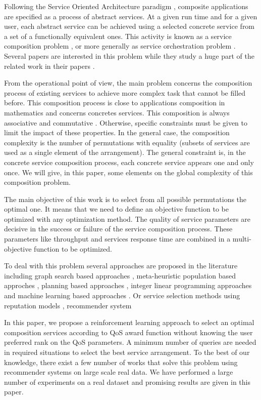 \documentclass[10pt,journal,compsoc]{IEEEtran}
\begin{document}
Following  the Service Oriented Architecture paradigm \cite{Alrifai:2010}, composite applications are specified as a process of abstract services. At a given run time and for a given user, each abstract service can be achieved using a selected concrete service from a set of a functionally equivalent ones. This activity is known as a service composition problem \cite{stelmach2013}, or more generally as service orchestration problem \cite{Papazoglou2007}. Several papers are interested in this problem while they study a huge part of the related work in their papers \cite{Essaid2017,Zheng2015}. 

From the operational point of view, the main problem concerns the composition process of existing services to achieve more complex task that cannot be filled before. This composition process is close to applications composition in mathematics and concerns concretes services. This composition is always associative and commutative \cite{GABREL2015}. Otherwise, specific constraints must be given to limit the impact of these properties. In the general case, the composition complexity is the number of permutations with equality (subsets of services are used as a single element of the arrangement). The general constraint is, in the concrete service composition process, each concrete service appears one and only once. We will give, in this paper, some elements on the global complexity of this composition problem. 

The main objective of this work is to select from all possible permutations the optimal one.  It means that we need to define an objective function to be optimized with any optimization method. The quality of service parameters are decisive in the success or failure of the service composition process. These parameters like throughput and services response time are combined in a multi-objective function to be optimized.  

To deal with this problem several approaches are proposed in the literature including graph search based approaches \cite{deng2014,jiang2014,Rodriguez2016,Siebert2015}, meta-heuristic population based approches \cite{Deng2017,Deng2016c,Chandra2016,Wu2016,Zheng2015}, planning based approaches \cite{chen2017,Zou2014}, integer linear programming approaches \cite{} and machine learning based approaches \cite{Deng2016s,Deng2016m,Rao2011,BenMabrouk2009}. Or service selection methods using reputation models \cite{Wang2007,Wang2011},  recommender system \cite{Manikrao2005,Liu2005}

In this paper, we propose a reinforcement learning approach to select an optimal composition services according to QoS award function without knowing the user preferred rank on the QoS parameters. A minimum number of queries are needed in required situations to select the best service arrangement. To the best of our knowledge, there exist a few number of works that solve this problem using recommender systems on large scale real data. We have performed a large number of experiments on a real dataset \cite{Zheng2014} and promising results are given in this paper.
\end{document}
